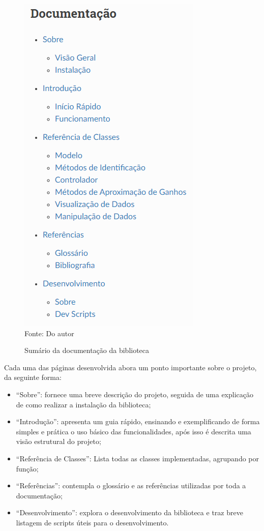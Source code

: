 \begin{figure}[H]
    \centering
    \caption{Sumário da documentação da biblioteca}
    \includegraphics[scale=0.6]{figuras/doc_summary}
    \label{fig:doc_summary}
    \\
    \vspace{0cm}\hspace{0cm}\small{Fonte: Do autor}
\end{figure}

Cada uma das páginas desenvolvida abora um ponto importante sobre o projeto, da seguinte forma:
\begin{itemize}
    \item ``Sobre'': fornece uma breve descrição do projeto, seguida de uma explicação de como realizar a instalação da
    biblioteca;
    \item ``Introdução'': apresenta um guia rápido, ensinando e exemplificando de forma simples e prática o uso básico das
    funcionalidades, após isso é descrita uma visão estrutural do projeto;
    \item ``Referência de Classes'': Lista todas as classes implementadas, agrupando por função;
    \item ``Referências'': contempla o glossário e as referências utilizadas por toda a documentação;
    \item ``Desenvolvimento'': explora o desenvolvimento da biblioteca e traz breve listagem de scripts úteis para
    o desenvolvimento.
\end{itemize}

